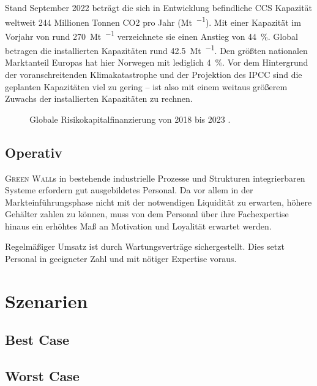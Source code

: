 Stand September 2022 beträgt die sich in Entwicklung befindliche CCS Kapazität weltweit \num{244} Millionen Tonnen CO2 pro Jahr (\unit{\mega\tonne\per\an}).
Mit einer Kapazität im Vorjahr von rund \qty{270}{\mega\tonne\per\an} verzeichnete sie einen Anstieg von \qty{44}{\percent}.
Global betragen die installierten Kapazitäten rund \qty{42.5}{\mega\tonne\per\an}.
Den größten nationalen Marktanteil Europas hat hier Norwegen mit lediglich \qty{4}{\percent}.
Vor dem Hintergrund der voranschreitenden Klimakatastrophe und der Projektion des IPCC sind die geplanten Kapazitäten viel zu gering -- ist also mit einem weitaus größerem Zuwachs der installierten Kapazitäten zu rechnen\cite{Book.EJR.CARBONCAPTUREUTILISATIONANDSTORAGEINTHEEUROPEANUNION.2023}.\par\medskip
%
\begin{figure}[h]
    \centering
    
    \caption[Globale Risikokapitalfinanzierung von 2018 bis 2023]{Globale Risikokapitalfinanzierung von 2018 bis 2023 \cite{Statista2022.GlobalVentureCapital}.}\label{fig:glob ccus vc inv}
\end{figure}

\subsection{Operativ}

\textsc{Green Wall}s in bestehende industrielle Prozesse und Strukturen integrierbaren Systeme erfordern gut ausgebildetes Personal.
Da vor allem in der Markteinführungsphase nicht mit der notwendigen Liquidität zu erwarten, höhere Gehälter zahlen zu können, muss von dem Personal über ihre Fachexpertise hinaus ein erhöhtes Maß an Motivation und Loyalität erwartet werden.\par\medskip

Regelmäßiger Umsatz ist durch Wartungsverträge sichergestellt.
Dies setzt Personal in geeigneter Zahl und mit nötiger Expertise voraus.

\section{Szenarien}

\subsection{Best Case}

\subsection{Worst Case}

